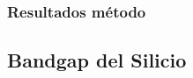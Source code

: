 \documentclass[a4paper,10pt]{article}
\begin{document}
\subsubsection{Resultados método}
%
\subsection{Bandgap del Silicio}
\end{document}
